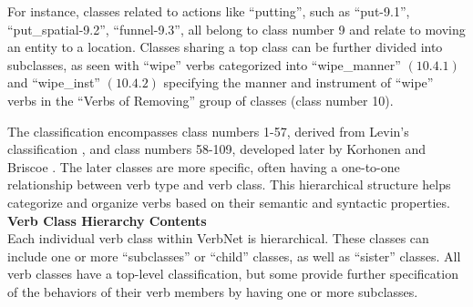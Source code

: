 For instance, classes related to actions like \enquote{putting}, such as \enquote{put-9.1}, \enquote{put\_spatial-9.2}, \enquote{funnel-9.3}, all belong to class number 9 and relate to moving an entity to a location. Classes sharing a top class can be further divided into subclasses, as seen with \enquote{wipe} verbs categorized into \enquote{wipe\_manner} $(10.4.1)$ and \enquote{wipe\_inst} $(10.4.2)$ specifying the manner and instrument of \enquote{wipe} verbs in the \enquote{Verbs of Removing} group of classes (class number 10).

The classification encompasses class numbers 1-57, derived from Levin's classification \cite{levin1993english}, and class numbers 58-109, developed later by Korhonen and Briscoe \cite{korhonen2004extended}. The later classes are more specific, often having a one-to-one relationship between verb type and verb class. This hierarchical structure helps categorize and organize verbs based on their semantic and syntactic properties.\\ 
\textbf{Verb Class Hierarchy Contents}\\ 
Each individual verb class within VerbNet is hierarchical. These classes can include one or more \enquote{subclasses} or \enquote{child} classes, as well as \enquote{sister} classes. All verb classes have a top-level classification, but some provide further specification of the behaviors of their verb members by having one or more subclasses. 


